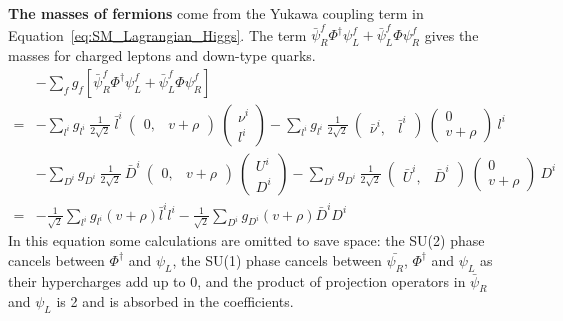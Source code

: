 \textbf{The masses of fermions} come from the Yukawa coupling term in Equation~\ref{eq:SM_Lagrangian_Higgs}.
The term $\bar{\psi}^{f}_{R}\Phi^{\dagger}\psi^{f}_{L} + \bar{\psi}^{f}_{L}\Phi\psi^{f}_{R}$ gives the masses for charged leptons and down-type quarks.
\begin{equation}\label{eq:yukawa_mass}
  \begin{split}
      & -\sum_{f} g_{f} [\bar{\psi}^{f}_{R}\Phi^{\dagger}\psi^{f}_{L} + \bar{\psi}^{f}_{L}\Phi\psi^{f}_{R} ] \\
    = & - \sum_{l^{i}} g_{l^{i}} ~\frac{1}{2\sqrt{2}}~\bar{l}^{i} ~\begin{pmatrix} 0 ,& v+\rho \end{pmatrix} ~\begin{pmatrix} \nu^{i} \\ l^{i} \end{pmatrix}
        - \sum_{l^{i}} g_{l^{i}} ~\frac{1}{2\sqrt{2}}~\begin{pmatrix} \bar{\nu}^{i} ,& \bar{l}^{i} \end{pmatrix} ~\begin{pmatrix} 0 \\ v+\rho \end{pmatrix} ~l^{i} \\
      & - \sum_{D^{i}} g_{D^{i}} ~\frac{1}{2\sqrt{2}}~\bar{D}^{i} ~\begin{pmatrix} 0 ,& v+\rho \end{pmatrix} ~\begin{pmatrix} U^{i} \\ D^{i} \end{pmatrix}
        - \sum_{D^{i}} g_{D^{i}} ~\frac{1}{2\sqrt{2}}~\begin{pmatrix} \bar{U}^{i} ,& \bar{D}^{i} \end{pmatrix} ~\begin{pmatrix} 0 \\ v+\rho \end{pmatrix} ~D^{i} \\
    = & - \frac{1}{\sqrt{2}} \sum_{l^{i}} g_{l^{i}}  (v+\rho) \bar{l}^{i} l^{i}
        - \frac{1}{\sqrt{2}} \sum_{D^{i}} g_{D^{i}}  (v+\rho) \bar{D}^{i} D^{i}    
  \end{split}
\end{equation}
In this equation some calculations are omitted to save space:
the SU(2) phase cancels between $\Phi^{\dagger}$ and $\psi_{L}$, 
the SU(1) phase cancels between $\bar{\psi_{R}}$, $\Phi^{\dagger}$ and $\psi_{L}$ as their hypercharges add up to 0,
and the product of projection operators in $\bar{\psi}_{R}$ and $\psi_{L}$ is 2 and is absorbed in the coefficients.
